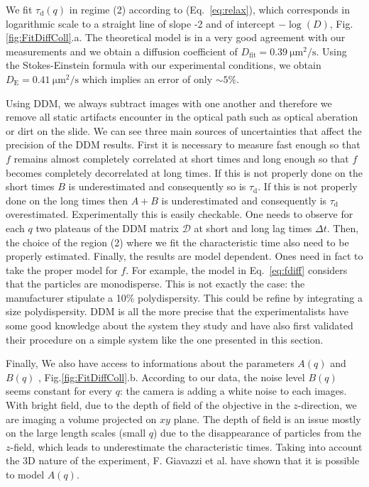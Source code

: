 \documentclass[prb,reprint,amsmath,amssymb]{revtex4-1}
\newcommand{\tg}[1]{{\color{magenta}#1}} %
\begin{document}
We fit $\tau_\text{d}(q)$ in regime (2) according to (Eq.~\ref{eq:relax}), which corresponds in logarithmic scale to a straight line of slope -2 and of intercept $-\log(D)$, Fig.\ref{fig:FitDiffColl}.a. The theoretical model is in a very good agreement with our measurements and we obtain a diffusion coefficient of $D_\text{fit} = \SI{0.39}{\micro\meter\squared\per\second}$. Using the Stokes-Einstein formula with our experimental conditions, we obtain $D_\text{E} = \SI{0.41}{\micro\meter\squared\per\second}$ which implies an error of only $\sim 5 \%$. 

\tg{Using DDM, we always subtract images with one another and therefore we remove all static artifacts encounter in the optical path such as optical aberation or dirt on the slide. We can see three main sources of uncertainties that affect the precision of the DDM results. First it is necessary to measure fast enough so that $f$ remains almost completely correlated at short times and long enough so that $f$ becomes completely decorrelated at long times. If this is not properly done on the short times $B$ is underestimated and consequently so is $\tau_\text{d}$. If this is not properly done on the long times then  $A+B$ is underestimated and consequently is $\tau_\text{d}$ overestimated. Experimentally this is easily checkable. One needs to observe for each $q$ two plateaus of the DDM matrix $\mathcal{D}$ at short and long lag times $\Delta t$. Then, the choice of the region (2) where we fit the characteristic time also need to be properly estimated. Finally, the results are model dependent. Ones need in fact to take the proper model for $f$. For example, the model in Eq.~\eqref{eq:fdiff}  considers that the particles are monodisperse. This is not exactly the case: the manufacturer stipulate a 10\% polydispersity. This could be refine by integrating a size polydispersity. DDM is all the more precise that the experimentalists have some good knowledge about the system they study and have also first validated their procedure on a simple system like the one presented in this section}.

Finally, We also have access to informations about the parameters $A(q)$ and $B(q)$ , Fig.\ref{fig:FitDiffColl}.b. According to our data, the noise level $B(q)$ seems constant for every $q$: the camera is adding a white noise to each images. With bright field, due to the depth of field of the objective in the $z$-direction, we are imaging a volume projected on $xy$ plane. \tg{The depth of field is an issue mostly on the large length scales} (small $q$) due to the disappearance of particles from the $z$-field, which leads to underestimate the characteristic times\cite {4_Martinez20121637}. Taking into account the 3D nature of the experiment,  F. Giavazzi et al.\citep{3_DDM3D} have shown that it is possible to model $A(q)$.
\end{document}

